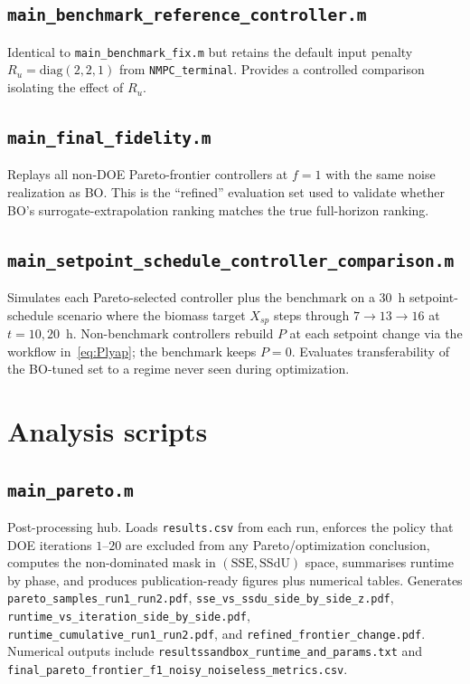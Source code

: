 \documentclass[11pt,a4paper]{article}
\newcommand{\sse}{\mathrm{SSE}}
\newcommand{\ssdu}{\mathrm{SSdU}}
\begin{document}
\subsection{\texttt{main\_benchmark\_reference\_controller.m}}
Identical to \texttt{main\_benchmark\_fix.m} but retains the default input penalty $R_u = \mathrm{diag}(2, 2, 1)$ from \texttt{NMPC\_terminal}. Provides a controlled comparison isolating the effect of $R_u$.

\subsection{\texttt{main\_final\_fidelity.m}}
Replays all non-DOE Pareto-frontier controllers at $f = 1$ with the same noise realization as BO. This is the ``refined'' evaluation set used to validate whether BO's surrogate-extrapolation ranking matches the true full-horizon ranking.

\subsection{\texttt{main\_setpoint\_schedule\_controller\_comparison.m}}
Simulates each Pareto-selected controller plus the benchmark on a 30~h setpoint-schedule scenario where the biomass target $X_{sp}$ steps through $7 \to 13 \to 16$ at $t = 10, 20$~h. Non-benchmark controllers rebuild $P$ at each setpoint change via the workflow in~\eqref{eq:Plyap}; the benchmark keeps $P = 0$. Evaluates transferability of the BO-tuned set to a regime never seen during optimization.

\section{Analysis scripts}
\label{sec:analysisscripts}

\subsection{\texttt{main\_pareto.m}}
Post-processing hub. Loads \texttt{results.csv} from each run, enforces the policy that DOE iterations $1$--$20$ are excluded from any Pareto/optimization conclusion, computes the non-dominated mask in $(\sse, \ssdu)$ space, summarises runtime by phase, and produces publication-ready figures plus numerical tables. Generates \texttt{pareto\_samples\_run1\_run2.pdf}, \texttt{sse\_vs\_ssdu\_side\_by\_side\_z.pdf}, \texttt{runtime\_vs\_iteration\_side\_by\_side.pdf}, \texttt{runtime\_cumulative\_run1\_run2.pdf}, and \texttt{refined\_frontier\_change.pdf}. Numerical outputs include \texttt{resultssandbox\_runtime\_and\_params.txt} and \texttt{final\_pareto\_frontier\_f1\_noisy\_noiseless\_metrics.csv}.
\end{document}
